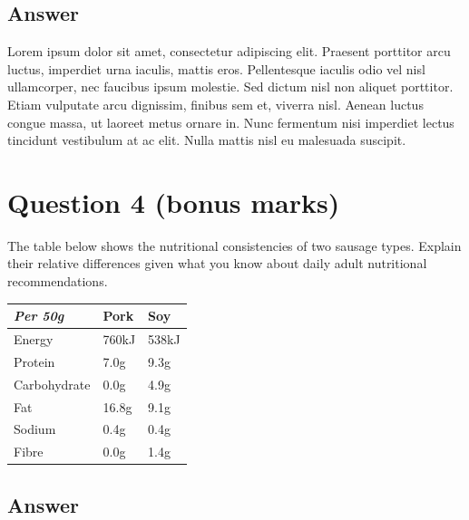 \documentclass[
	12pt, %
]{../Template/fphw}
\begin{document}

\subsection*{Answer} 

Lorem ipsum dolor sit amet, consectetur adipiscing elit. Praesent porttitor arcu luctus, imperdiet urna iaculis, mattis eros. Pellentesque iaculis odio vel nisl ullamcorper, nec faucibus ipsum molestie. Sed dictum nisl non aliquet porttitor. Etiam vulputate arcu dignissim, finibus sem et, viverra nisl. Aenean luctus congue massa, ut laoreet metus ornare in. Nunc fermentum nisi imperdiet lectus tincidunt vestibulum at ac elit. Nulla mattis nisl eu malesuada suscipit.


\section*{Question 4 (bonus marks)}

\begin{problem}
	The table below shows the nutritional consistencies of two sausage types. Explain their relative differences given what you know about daily adult nutritional recommendations.
	
	\bigskip
    
	\begin{center}
		\begin{tabular}{l l l}
			\toprule
			\textit{Per 50g} & Pork & Soy \\
			\midrule
			Energy & 760kJ & 538kJ\\
			Protein & 7.0g & 9.3g\\
			Carbohydrate & 0.0g & 4.9g\\
			Fat & 16.8g & 9.1g\\
			Sodium & 0.4g & 0.4g\\
			Fibre & 0.0g & 1.4g\\
			\bottomrule
		\end{tabular}
	\end{center}
	
	\medskip
\end{problem}


\subsection*{Answer}
\end{document}

